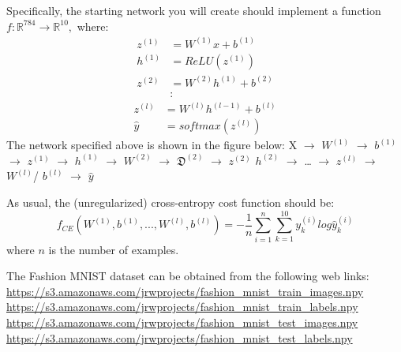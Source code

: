 \documentclass[
  letterpaper,
  DIV=11,
  numbers=noendperiod]{scrartcl}
\begin{document}
Specifically, the starting network you will create should implement a
function \(f:\mathbb{R}^{784}\rightarrow\mathbb{R}^{10},\) where:
\[\begin{aligned}z^{(1)}&=W^{(1)}x+b^{(1)}\\ h^{(1)}&=ReLU(z^{(1)})\\ z^{(2)}&=W^{(2)}h^{(1)}+b^{(2)}\\ &:\end{aligned}\]
\[\begin{aligned}z^{(l)}&=W^{(l)}h^{(l-1)}+b^{(l)}\\ \hat{y}&=softmax(z^{(l)})\end{aligned}\]
The network specified above is shown in the figure below: X
\(\rightarrow\) \(W^{(1)}\) \(\rightarrow\) \(b^{(1)}\) \(\rightarrow\)
\(z^{(1)}\) \(\rightarrow\) \(h^{(1)}\) \(\rightarrow\) \(W^{(2)}\)
\(\rightarrow\) \(\mathfrak{D}^{(2)}\) \(\rightarrow\) \(z^{(2)}\)
\(h^{(2)}\) \(\rightarrow\) \ldots{} \(\rightarrow\) \(z^{(l)}\)
\(\rightarrow\) \(W^{(l)}\)/ \(b^{(l)}\) \(\rightarrow\) \(\hat{y}\)

As usual, the (unregularized) cross-entropy cost function should be:
\[f_{CE}(W^{(1)},b^{(1)},...,W^{(l)},b^{(l)})=-\frac{1}{n}\sum_{i=1}^{n}\sum_{k=1}^{10}y_{k}^{(i)}log\hat{y}_{k}^{(i)}\]
where \(n\) is the number of examples.

The Fashion MNIST dataset can be obtained from the following web links:
\url{https://s3.amazonaws.com/jrwprojects/fashion_mnist_train_images.npy}
\url{https://s3.amazonaws.com/jrwprojects/fashion_mnist_train_labels.npy}
\url{https://s3.amazonaws.com/jrwprojects/fashion_mnist_test_images.npy}
\url{https://s3.amazonaws.com/jrwprojects/fashion_mnist_test_labels.npy}
\end{document}
